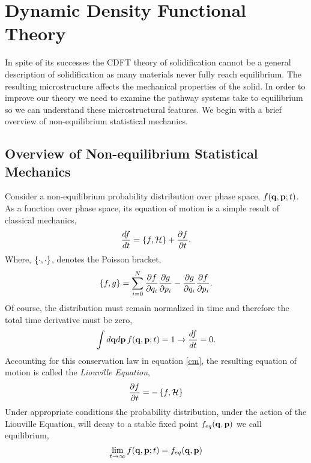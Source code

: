\section{Dynamic Density Functional Theory} %

In spite of its successes the CDFT theory of solidification cannot be a general
description of solidification as many materials never fully reach equilibrium.
The resulting microstructure affects the mechanical properties of the solid. In
order to improve our theory we need to examine the pathway systems take to
equilibrium so we can understand these microstructural features. We begin with
a brief overview of non-equilibrium statistical mechanics.

\subsection{Overview of Non-equilibrium Statistical Mechanics} %

Consider a non-equilibrium probability distribution over phase space, $f(\mathbf{q},
\mathbf{p}; t)$. As a function over phase space, its equation of motion is a simple
result of classical mechanics,
%
\begin{equation}
    \label{cm} 
    \frac{d f}{dt} = \left\lbrace f, \mathcal{H} \right\rbrace + \frac{\partial f}{\partial t}.
\end{equation}
%
Where, $\left\lbrace \cdot, \cdot \right\rbrace$, denotes the Poisson bracket,
%
\begin{equation}
    \left\lbrace f, g \right\rbrace = \sum_{i = 0}^N \frac{\partial f}{\partial q_i}
        \frac{\partial g}{\partial p_i} - \frac{\partial g}{\partial q_i}
        \frac{\partial f}{\partial p_i}.
\end{equation}
%
Of course, the distribution must remain normalized in time and therefore the 
total time derivative must be zero,
%
\begin{equation}
    \int d\mathbf{q} d\mathbf{p}\, f(\mathbf{q}, \mathbf{p}; t) = 1 \rightarrow \frac{d f}{dt} = 0.
\end{equation}
%
Accounting for this conservation law in equation \ref{cm}, the resulting
equation of motion is called the \textit{Liouville Equation},
%
\begin{equation}
    \label{liouville} 
    \frac{\partial f}{\partial t} = - \left\lbrace f , \mathcal{H} \right\rbrace
\end{equation}
%
Under appropriate conditions the probability distribution, under the action of
the Liouville Equation, will decay to a stable fixed point $f_{eq}(\mathbf{q}, \mathbf{p})$ we
call equilibrium,
%
\begin{equation}
    \lim_{t \rightarrow \infty} f(\mathbf{q}, \mathbf{p}; t) = f_{eq}(\mathbf{q}, \mathbf{p})
\end{equation}
%

